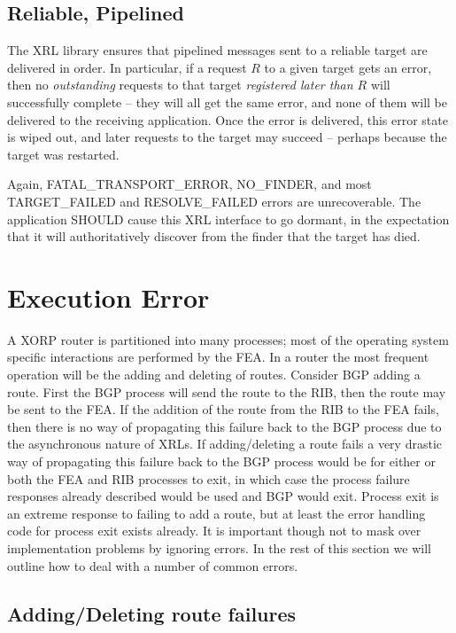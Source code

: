 \documentclass[11pt]{article}
\begin{document}
\subsection*{Reliable, Pipelined}

The XRL library ensures that pipelined messages sent to a reliable target
are delivered in order. In particular, if a request $R$ to a given target
gets an error, then no \emph{outstanding} requests to that target
\emph{registered later than $R$} will successfully complete -- they will
all get the same error, and none of them will be delivered to the receiving
application. Once the error is delivered, this error state is wiped out,
and later requests to the target may succeed -- perhaps because the target
was restarted.

Again, FATAL\_TRANSPORT\_ERROR, NO\_FINDER, and most TARGET\_FAILED and
RESOLVE\_FAILED errors are unrecoverable.
The application SHOULD cause this XRL interface to go dormant, in the
expectation that it will authoritatively discover from the finder that
the target has died.

\section{Execution Error}

A XORP router is partitioned into many processes; most of the operating
system specific interactions are performed by the FEA. In a router the
most frequent operation will be the adding and deleting of routes.
Consider BGP adding a route. First the BGP process will send the route
to the RIB, then the route may be sent to the FEA. If the addition of the
route from the RIB to the FEA fails, then there is no way of
propagating this failure back to the BGP process due to the
asynchronous nature of XRLs. If adding/deleting a route fails a very
drastic way of propagating this failure back to the BGP process would
be for either or both the FEA and RIB processes to exit, in which case
the process failure responses already described would be used and BGP
would exit. Process exit is an extreme response to failing
to add a route, but at least the error handling code for process exit
exists already. It is important though not
to mask over implementation problems by ignoring errors. In the rest
of this section we will outline how to deal with a number of common
errors.

\subsection{Adding/Deleting route failures}
\end{document}
